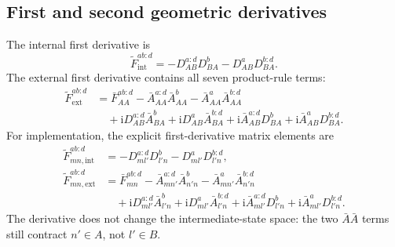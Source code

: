 \documentclass[prx,amsmath,amssymb,superscriptaddress,longbibliography]{revtex4-2}
\newcommand{\ii}{\mathrm{i}}
\begin{document}
\subsection{First and second geometric derivatives}
The internal first derivative is
\begin{equation}
 \widetilde F_{\mathrm{int}}^{ab:d}
 =-D_{AB}^{a:d}D_{BA}^b-D_{AB}^aD_{BA}^{b:d}.
 \label{eq:Ffirst}
\end{equation}
The external first derivative contains all seven product-rule terms:
\begin{align}
 \widetilde F_{\mathrm{ext}}^{ab:d}
 &=\bar F_{AA}^{ab:d}
 -\bar A_{AA}^{a:d}\bar A_{AA}^b-\bar A_{AA}^a\bar A_{AA}^{b:d}
 \nonumber\\
 &\quad+\ii D_{AB}^{a:d}\bar A_{BA}^b+\ii D_{AB}^a\bar A_{BA}^{b:d}
 +\ii\bar A_{AB}^{a:d}D_{BA}^b+\ii\bar A_{AB}^aD_{BA}^{b:d}.
 \label{eq:Fext-first}
\end{align}
For implementation, the explicit first-derivative matrix elements are
\begin{align}
 \widetilde F_{mn,\mathrm{int}}^{ab:d}
 &=-D_{ml'}^{a:d}D_{l'n}^b-D_{ml'}^aD_{l'n}^{b:d},\nonumber\\
 \widetilde F_{mn,\mathrm{ext}}^{ab:d}
 &=\bar F_{mn}^{ab:d}-\bar A_{mn'}^{a:d}\bar A_{n'n}^b
                        -\bar A_{mn'}^a\bar A_{n'n}^{b:d}\nonumber\\
 &\quad+\ii D_{ml'}^{a:d}\bar A_{l'n}^b
       +\ii D_{ml'}^a\bar A_{l'n}^{b:d}
       +\ii\bar A_{ml'}^{a:d}D_{l'n}^b
       +\ii\bar A_{ml'}^aD_{l'n}^{b:d}.
 \label{eq:Ffirst-components}
\end{align}
The derivative does not change the intermediate-state space: the two
$\bar A\bar A$ terms still contract $n'\in A$, not $l'\in B$.
\end{document}
